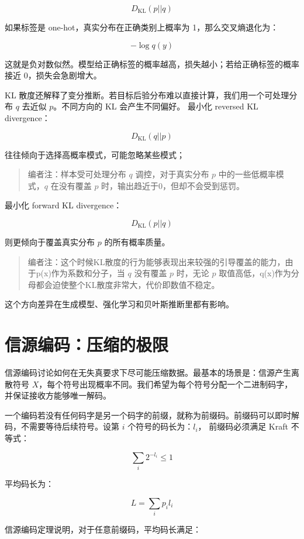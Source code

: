 \[
D_{\mathrm{KL}}(p||q)
\]

如果标签是 one-hot，真实分布在正确类别上概率为 1，那么交叉熵退化为：

\[
-\log q(y)
\]

这就是负对数似然。模型给正确标签的概率越高，损失越小；若给正确标签的概率接近 0，损失会急剧增大。

KL 散度还解释了变分推断。若目标后验分布难以直接计算，我们用一个可处理分布 \(q\) 去近似 \(p\)。不同方向的 KL 会产生不同偏好。
最小化 reversed KL divergence：

\[
D_{\mathrm{KL}}(q||p)
\]

往往倾向于选择高概率模式，可能忽略某些模式；

\begin{quote}
编者注：样本受可处理分布 \(q\) 调控，对于真实分布 \(p\) 中的一些低概率模式，\(q\) 在没有覆盖 \(p\) 时，输出趋近于\(0\)，但却不会受到惩罚。
\end{quote}

最小化 forward KL divergence：

\[
D_{\mathrm{KL}}(p||q)
\]

则更倾向于覆盖真实分布 \(p\) 的所有概率质量。

\begin{quote}
编者注：这个时候KL散度的行为能够表现出来较强的引导覆盖的能力，由于p(x)作为系数和分子，当 \(q\) 没有覆盖 \(p\) 时，无论 \(p\) 取值高低，q(x)作为分母都会迫使整个KL散度非常大，代价即数值不稳定。
\end{quote}

这个方向差异在生成模型、强化学习和贝叶斯推断里都有影响。

\section{信源编码：压缩的极限}

信源编码讨论如何在无失真要求下尽可能压缩数据。最基本的场景是：信源产生离散符号 \(X\)，每个符号出现概率不同。我们希望为每个符号分配一个二进制码字，并保证接收方能够唯一解码。

一个编码若没有任何码字是另一个码字的前缀，就称为前缀码。前缀码可以即时解码，不需要等待后续符号。设第 \(i\) 个符号的码长为：\(l_i\)， 前缀码必须满足 Kraft 不等式：

\[
\sum_i 2^{-l_i}\le 1
\]

平均码长为：

\[
L=\sum_i p_i l_i
\]

信源编码定理说明，对于任意前缀码，平均码长满足：

